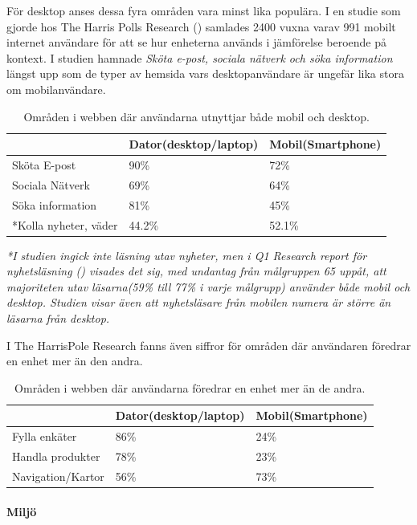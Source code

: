 \documentclass[11pt]{article}
\begin{document}
För desktop anses dessa fyra områden vara minst lika populära. I en studie som gjorde hos The Harris Polls Research (\cite{harrispoll}) samlades 2400 vuxna varav 991 mobilt internet användare för att se hur enheterna används i jämförelse beroende på kontext. I studien hamnade \textit{Sköta e-post, sociala nätverk och söka information} längst upp som de typer av hemsida vars desktopanvändare är ungefär lika stora om mobilanvändare.
\\
\begin{table}[H]
	\centering
	\begin{tabular}{|p{4cm}|p{4cm}|p{4cm}|}
	\hline
	~&Dator(desktop/laptop)&Mobil(Smartphone)\\ \hline
	Sköta E-post &90\%&72\%\\ \hline
	Sociala Nätverk&69\%&64\%\\ \hline
	Söka information&81\%&45\%\\ \hline
	*Kolla nyheter, väder&44.2\%&52.1\%\\ \hline
	\end{tabular}
    \caption {Områden i webben där användarna utnyttjar både mobil och desktop.}
\end{table}
\textit{*I studien ingick inte läsning utav nyheter, men i Q1 Research report för nyhetsläsning (\cite{q1research}) visades det sig, med undantag från målgruppen 65 uppåt, att majoriteten utav läsarna(59\% till 77\% i varje målgrupp) använder både mobil och desktop. Studien visar även att nyhetsläsare från mobilen numera är större än läsarna från desktop.}

I The HarrisPole Research fanns även siffror för områden där användaren föredrar en enhet mer än den andra.

\begin{table}[H]
	\centering
	\begin{tabular}{|p{4cm}|p{4cm}|p{4cm}|}
	\hline
	~&Dator(desktop/laptop)&Mobil(Smartphone)\\ \hline
	Fylla enkäter &86\%&24\%\\ \hline
	Handla produkter&78\%&23\%\\ \hline
	Navigation/Kartor&56\%&73\%\\ \hline
	\end{tabular}
    \caption {Områden i webben där användarna föredrar en enhet mer än de andra.}
\end{table}

\paragraph{Miljö} \mbox{}
\end{document}
